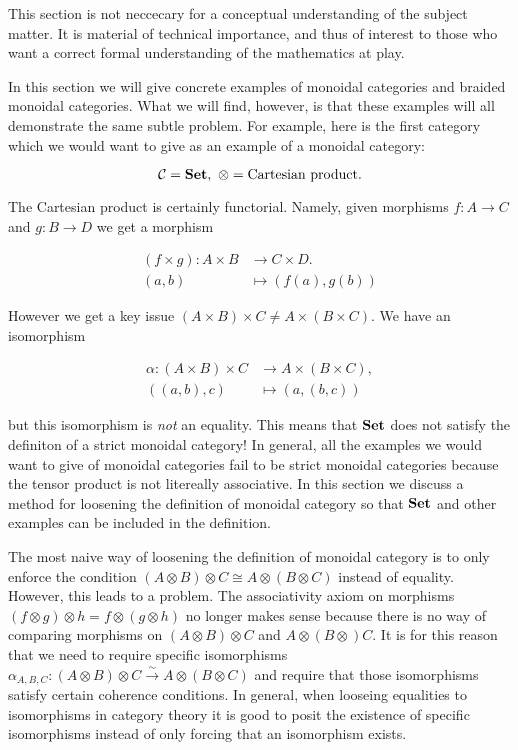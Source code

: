 \begin{warn} This section is not neccecary for a conceptual understanding of the subject matter. It is material of technical importance, and thus of interest to those who want a correct formal understanding of the mathematics at play.
\end{warn}

In this section we will give concrete examples of monoidal categories and braided monoidal categories. What we will find, however, is that these examples will all demonstrate the same subtle problem. For example, here is the first category which we would want to give as an example of a monoidal category:

$${\mathcal C}={\bf Set},\,\, \otimes = \text{Cartesian product}.$$

The Cartesian product is certainly functorial. Namely, given morphisms $f:A\to C$ and $g:B\to D$ we get a morphism

\begin{align*}
(f\times g): A\times B &\xrightarrow{} C\times D.\\
(a,b)&\mapsto (f(a), g(b))
\end{align*}

However we get a key issue $(A\times B)\times C \neq A\times (B\times C)$. We have an isomorphism

\begin{align*}
\alpha : (A\times B )\times C &\xrightarrow{} A \times (B\times C),\\
((a,b),c)&\mapsto (a,(b,c))
\end{align*}

but this isomorphism is {\em not} an equality. This means that ${\bf Set}$ does not satisfy the definiton of a strict monoidal category! In general, all the examples we would want to give of monoidal categories fail to be strict monoidal categories because the tensor product is not litereally associative. In this section we discuss a method for loosening the definition of monoidal category so that ${\bf Set}$ and other examples can be included in the definition.

\begin{rem}
The most naive way of loosening the definition of monoidal category is to only enforce the condition $(A\otimes B)\otimes C\cong A\otimes (B\otimes C)$ instead of equality. However, this leads to a problem. The associativity axiom on morphisms $(f\otimes g)\otimes h = f\otimes (g\otimes h)$  no longer makes sense because there is no way of comparing morphisms on $(A\otimes B)\otimes C$ and $A\otimes (B\otimes )C$. It is for this reason that we need to require specific isomorphisms $\alpha_{A,B,C}:(A\otimes B)\otimes C\xrightarrow{\sim} A\otimes (B\otimes C)$ and require that  those isomorphisms satisfy certain coherence conditions. In general, when looseing equalities to isomorphisms in category theory it is good to posit the existence of specific isomorphisms instead of only forcing that an isomorphism exists.
\end{rem}

